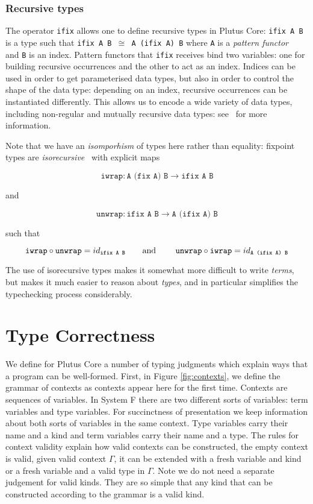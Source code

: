 \documentclass[a4paper]{article}
\begin{document}
\subsubsection{Recursive types}
\label{sec:ifix-note}
\noindent
The operator \texttt{ifix} allows one to define recursive types in
Plutus Core: \texttt{ifix A B} is a type such that \texttt{ifix A B
  $\cong$ A (ifix A) B} where \texttt{A} is a \textit{pattern
  functor}~\citep[2.4]{backhouseetal98} and \texttt{B} is an
index. Pattern functors that \texttt{ifix} receives bind two
variables: one for building recursive occurrences and the other to act
as an index. Indices can be used in order to get parameterised data
types, but also in order to control the shape of the data type:
depending on an index, recursive occurrences can be instantiated
differently.  This allows us to encode a wide variety of data types,
including non-regular and mutually recursive data types:
see~\citep[3.1]{unravelling-recursion} for more information.

Note that we have an \textit{isomporhism} of types here rather than
equality: fixpoint types are
\textit{isorecursive}~\citep[20.2]{Pierce:TAPL} with explicit maps

$$
\texttt{iwrap} : \texttt{A (fix A) B} \rightarrow \texttt{ifix A B}
$$

\noindent and

$$
\texttt{unwrap} : \texttt{ifix A B} \rightarrow  \texttt{A (ifix A) B}
$$

\noindent such that

$$
\texttt{iwrap} \circ \texttt{unwrap} = id_{ \texttt{ifix A B}}
\mbox{\qquad and \qquad}
\texttt{unwrap} \circ \texttt{iwrap} = id_{ \texttt{A (ifix A) B}}
$$

\noindent The use of isorecursive types makes it somewhat more difficult to
write \textit{terms}, but makes it much easier to reason about
\textit{types}, and in particular simplifies the typechecking process
considerably.

\section{Type Correctness}

We define for Plutus Core a number of typing judgments which explain
ways that a program can be well-formed. First, in Figure
\ref{fig:contexts}, we define the grammar of contexts as
contexts appear here for the first time. Contexts are sequences of
variables. In System F there are two different sorts of variables:
term variables and type variables. For succinctness of presentation we
keep information about both sorts of variables in the same
context. Type variables carry their name and a kind and term variables
carry their name and a type. The rules for context validity explain
how valid contexts can be constructed, the empty context is valid,
given valid context $\Gamma$, it can be extended with a fresh variable
and kind or a fresh variable and a valid type in $\Gamma$. Note we do
not need a separate judgement for valid kinds. They are so simple that
any kind that can be constructed according to the grammar is a valid
kind.
\end{document}
